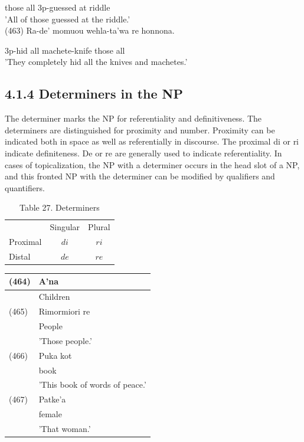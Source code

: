\documentclass[10pt]{article}
\begin{document}
those all 3p-guessed at riddle\\
'All of those guessed at the riddle.'\\
(463) Ra-de' momuou wehla-ta'wa re honnona.

3p-hid all machete-knife those all\\
'They completely hid all the knives and machetes.'

\subsection*{4.1.4 Determiners in the NP}
The determiner marks the NP for referentiality and definitiveness. The determiners are distinguished for proximity and number. Proximity can be indicated both in space as well as referentially in discourse. The proximal di or ri indicate definiteness. De or re are generally used to indicate referentiality. In cases of topicalization, the NP with a determiner occurs in the head slot of a NP, and this fronted NP with the determiner can be modified by qualifiers and quantifiers.

\begin{table}[h]
\begin{center}
\captionsetup{labelformat=empty}
\caption{Table 27. Determiners}
\begin{tabular}{|lcc|}
\hline
 & Singular & Plural \\
Proximal & \(d i\) & \(r i\) \\
Distal & \(d e\) & \(r e\) \\
\hline
\end{tabular}
\end{center}
\end{table}

\begin{center}
\begin{tabular}{|l|l|}
\hline
(464) & A'na \\
\hline
 & Children \\
\hline
(465) & Rimormiori re \\
\hline
 & People \\
\hline
 & 'Those people.' \\
\hline
(466) & Puka kot \\
\hline
 & book \\
\hline
 & 'This book of words of peace.' \\
\hline
(467) & Patke'a \\
\hline
 & female \\
\hline
 & 'That woman.' \\
\hline
\end{tabular}
\end{center}
\end{document}
